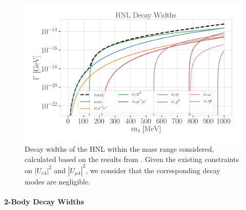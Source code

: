 \begin{figure}[h]
    \includegraphics{figures/hnl_simulation/decay_theory/hnl_decay_widths_up_to_1.0_GeV_linear.png}
    \caption[HNL decay widths]{Decay widths of the HNL within the mass range considered, calculated based on the results from \cite{Coloma:2020lgy}. Given the existing constraints on $|U_{e4}|^{2}$ and $|U_{\mu4}|^{2}$, we consider that the corresponding decay modes are negligible.}
\end{figure}


\paragraph{2-Body Decay Widths}


